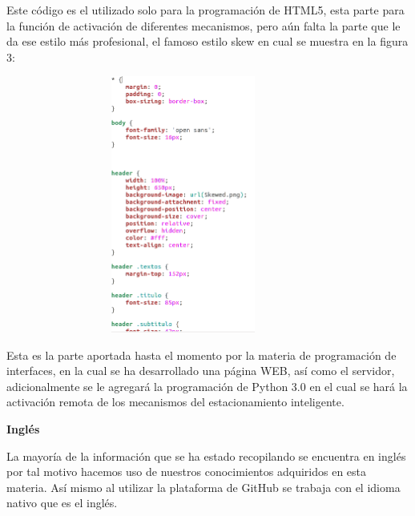 \documentclass[12pt]{article}
\begin{document}

\par


\vspace{\baselineskip}
Este código es el utilizado solo para la programación de HTML5, esta parte para la función de activación de diferentes mecanismos, pero aún falta la parte que le da ese estilo más profesional, el famoso estilo skew en cual se muestra en la figura 3:\par




\begin{figure}[H]
\advance\leftskip 1.78in		\includegraphics[width=3.76in,height=3.33in]{./media/image16.png}
\end{figure}



\par


\vspace{\baselineskip}
Esta es la parte aportada hasta el momento por la materia de programación de interfaces, en la cual se ha desarrollado una página WEB, así como el servidor, adicionalmente se le agregará la programación de Python 3.0 en el cual se hará la activación remota de los mecanismos del estacionamiento inteligente.\par
\newpage
\textbf{Inglés}\par

La mayoría de la información que se ha estado recopilando se encuentra en inglés por tal motivo hacemos uso de nuestros conocimientos adquiridos en esta materia. Así mismo al utilizar la plataforma de GitHub se trabaja con el idioma nativo que es el inglés. \par
\end{document}
